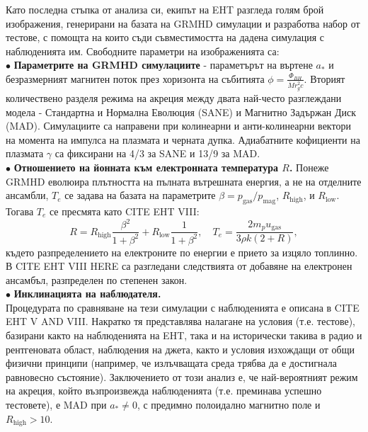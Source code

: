 Като последна стъпка от анализа си, екипът на EHT разгледа голям брой изображения, генерирани на базата на GRMHD симулации и разработва набор от тестове, с помощта на които съди съвместимостта на дадена симулация с наблюденията им. Свободните параметри на изображенията са:\\\newline
$\bullet$ \textbf{Параметрите на GRMHD симулациите} - параметърът на въртене $a_*$ и безразмерният магнитен поток през хоризонта на събитията $\phi = \frac{\Phi_{BH}}{\dot{M}r_g^2c}$. Вторият количествено разделя режима на акреция между двата най-често разглеждани модела - Стандартна и Нормална Еволюция (SANE) и Магнитно Задържан Диск (MAD). Симулациите са направени при колинеарни и анти-колинеарни вектори на момента на импулса на плазмата и черната дупка. Адиабатните кофициенти на плазмата $\gamma$ са фиксирани на 4/3 за SANE и 13/9 за MAD.\\\newline
$\bullet$ \textbf{Отношението на йонната към електронната температура $R$.} Понеже GRMHD еволюира плътността на пълната вътрешната енергия, а не на отделните ансамбли, $T_e$ се задава на базата на параметрите $\beta = p_{\text{gas}} / p_\text{mag}$, $R_\text{high}$, и $R_\text{low}$. Тогава $T_e$ се пресмята като CITE EHT VIII:
\begin{equation}
	R = R_\text{high}\frac{\beta^2}{1 + \beta^2} + R_\text{low}\frac{1}{1 + \beta^2},\quad T_e = \frac{2m_pu_\text{gas}}{3\rho k (2 + R)},
\end{equation}   
където разпределението на електроните по енергии е прието за изцяло топлинно. В CITE EHT VIII HERE са разгледани следствията от добавяне на електронен ансамбъл, разпределен по степенен закон.\\\newline
$\bullet$ \textbf{Инклинацията на наблюдателя.}\\

Процедурата по сравняване на тези симулации с наблюденията е описана в CITE EHT V AND VIII. Накратко тя представлява налагане на условия (т.е. тестове), базирани както на наблюденията на EHT, така и на исторически такива в радио и рентгеновата област, наблюдения на джета, както и условия изхождащи от общи физични принципи (например, че излъчващата среда трябва да е достигнала равновесно състояние). Заключението от този анализ е, че най-вероятният режим на акреция, който възпроизвежда наблюденията (т.е. преминава успешно тестовете), е MAD при $a_*\ne 0$, с предимно полоидално магнитно поле и $R_\text{high} > 10$. 


